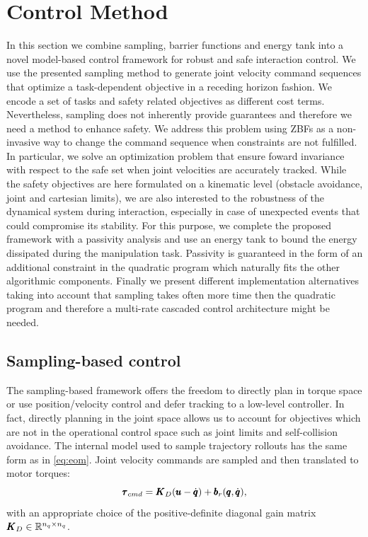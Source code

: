 \section{Control Method} \label{sec:control_method}

In this section we combine sampling, barrier functions and energy tank into a novel model-based control framework for robust and safe interaction control. We use the presented sampling method to generate joint velocity command sequences that optimize a task-dependent objective in a receding horizon fashion. We encode a set of tasks and safety related objectives as different cost terms. Nevertheless, sampling does not inherently provide guarantees and therefore we need a method to enhance safety. We address this problem using ZBFs as a non-invasive way to change the command sequence when constraints are not fulfilled. In particular, we solve an optimization problem that ensure foward invariance with respect to the safe set when joint velocities are accurately tracked. While the safety objectives are here formulated on a kinematic level (obstacle avoidance, joint and cartesian limits), we are also interested to the robustness of the dynamical system during interaction, especially in case of unexpected events that could compromise its stability. For this purpose, we complete the proposed framework with a passivity analysis and use an energy tank to bound the energy dissipated during the manipulation task. Passivity is guaranteed in the form of an additional constraint in the quadratic program which naturally fits the other algorithmic components. Finally we present different implementation alternatives taking into account that sampling takes often more time then the quadratic program and therefore a multi-rate cascaded control architecture might be needed. 

\subsection{Sampling-based control}
The sampling-based framework offers the freedom to directly plan in torque space or use position/velocity control and defer tracking to a low-level controller. In fact, directly planning in the joint space allows us to account for objectives which are not in the operational control space such as joint limits and self-collision avoidance. The internal model used to sample trajectory rollouts has the same form as in \eqref{eq:eom}. Joint velocity commands are sampled and then translated to motor torques:
\begin{equation}
    \pmb{\tau}_{cmd} = \pmb{K}_{D} (\pmb{u} - \dot{\pmb{q}}) + \pmb{b}_{r}(\pmb{q}, \dot{\pmb{q}}),
\end{equation}
with an appropriate choice of the positive-definite diagonal gain matrix $\pmb{K}_{D} \in \mathbb{R}^{n_q\times n_q}$. 

